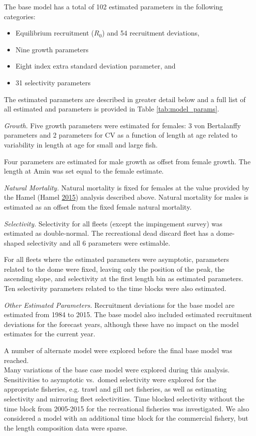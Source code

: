 \documentclass[12pt,]{article}
\begin{document}
The base model has a total of 102 estimated parameters in the following
categories:

\begin{itemize}
  \item Equilibrium recruitment ($R_0$) and 54 recruitment deviations,
  \item Nine growth parameters
  \item Eight index extra standard deviation parameter, and
  \item 31 selectivity parameters
\end{itemize}

The estimated parameters are described in greater detail below and a
full list of all estimated and parameters is provided in Table
\ref{tab:model_params}.

\emph{Growth.} Five growth parameters were estimated for females: 3 von
Bertalanffy parameters and 2 parameters for CV as a function of length
at age related to variability in length at age for small and large fish.

Four parameters are estimated for male growth as offset from female
growth. The length at Amin was set equal to the female estimate.

\emph{Natural Mortality.} Natural mortality is fixed for females at the
value provided by the Hamel (Hamel
\protect\hyperlink{ref-Hamel2015}{2015}) analysis described above.
Natural mortality for males is estimated as an offset from the fixed
female natural mortality.

\emph{Selectivity.} Selectivity for all fleets (except the impingement
survey) was estimated as double-normal. The recreational dead discard
fleet has a dome-shaped selectivity and all 6 parameters were estimable.

For all fleets where the estimated parameters were asymptotic,
parameters related to the dome were fixed, leaving only the position of
the peak, the ascending slope, and selectivity at the first length bin
as estimated parameters. Ten selectivity parameters related to the time
blocks were also estimated.

\emph{Other Estimated Parameters.} Recruitment deviations for the base
model are estimated from 1984 to 2015. The base model also included
estimated recruitment deviations for the forecast years, although these
have no impact on the model estimates for the current year.

A number of alternate model were explored before the final base model
was reached.\\
Many variations of the base case model were explored during this
analysis. Sensitivities to asymptotic vs.~domed selectivity were
explored for the appropriate fisheries, e.g. trawl and gill net
fisheries, as well as estimating selectivity and mirroring fleet
selectivities. Time blocked selectivity without the time block from
2005-2015 for the recreational fisheries was investigated. We also
considered a model with an additional time block for the commercial
fishery, but the length composition data were sparse.
\end{document}
